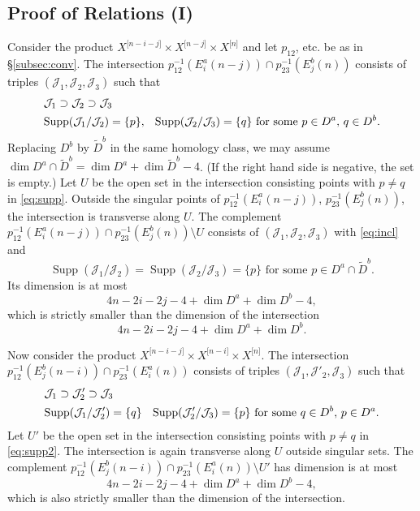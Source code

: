 \documentclass[12pt]{amsart}
\newcommand{\cal}{\mathcal}
\theoremstyle{definition}
\theoremstyle{remark}
\numberwithin{equation}{section}
\newcommand{\subsecref}[1]{\S\ref{#1}}
\newcommand{\Hilb}[2]{{#1}^{\lbrack{#2}\rbrack}} %
\newcommand{\HilbX}[1]{\Hilb{X}{#1}}
\newcommand{\idl}{\cal J} %
\newcommand{\Supp}{\operatorname{Supp}} %
\begin{document}
\subsection{Proof of Relations (I)}
%
Consider the product $\HilbX{n-i-j}\times\HilbX{n-j}\times\HilbX{n}$
and let $p_{12}$, etc. be as in \subsecref{subsec:conv}. The
intersection $p_{12}^{-1}(E_i^a(n-j))\cap p_{23}^{-1}(E_j^b(n))$
consists of triples $(\idl_1, \idl_2, \idl_3)$ such that
\begin{align}
  & \idl_1\supset\idl_2\supset\idl_3 \label{eq:incl}\\
  & \text{$\Supp(\idl_1/\idl_2) = \{ p\}$, \;
    $\Supp(\idl_2/\idl_3) = \{ q\}$ for some $p\in D^a$, $q\in D^b$.}
 \label{eq:supp}
\end{align}
Replacing $D^b$ by $\widetilde D^b$ in the same homology class, we may
assume
$\dim D^a\cap \widetilde D^b = \dim D^a + \dim \widetilde D^b - 4$.
(If the right hand side is negative, the set is empty.)
Let $U$ be the open set in the intersection consisting points
with $p\ne q$ in \eqref{eq:supp}.
Outside the singular points of $p_{12}^{-1}(E_i^a(n-j))$,
$p_{23}^{-1}(E_j^b(n))$, the intersection is transverse along $U$.
The complement
$p_{12}^{-1}(E_i^a(n-j))\cap p_{23}^{-1}(E_j^b(n))\setminus U$
consists of $(\idl_1, \idl_2, \idl_3)$ with \eqref{eq:incl} and
\begin{equation*}
  \text{$\Supp(\idl_1/\idl_2) = \Supp(\idl_2/\idl_3) = \{p\}$ for some
    $p\in D^a\cap \widetilde D^b$.}
\end{equation*}
Its dimension is at most
\begin{equation*}
  4n - 2i - 2j - 4 + \dim D^a + \dim D^b - 4,
\end{equation*}
which is strictly smaller than the dimension of the intersection
\begin{equation*}
  4n - 2i - 2j - 4 + \dim D^a + \dim D^b.
\end{equation*}

Now consider the product
$\HilbX{n-i-j}\times\HilbX{n-i}\times\HilbX{n}$.
The
intersection $p_{12}^{-1}(E_j^b(n-i))\cap p_{23}^{-1}(E_i^a(n))$
consists of triples $(\idl_1, \idl'_2, \idl_3)$ such that
\begin{align}
  & \idl_1\supset\idl'_2\supset\idl_3 \label{eq:incl2}\\
  & \text{$\Supp(\idl_1/\idl'_2) = \{q\}$ \;
    $\Supp(\idl'_2/\idl_3) = \{p\}$ for some $q\in D^b$, $p\in D^a$.}
  \label{eq:supp2}
\end{align}
Let $U'$ be the open set in the intersection consisting points
with $p\ne q$ in \eqref{eq:supp2}.
The intersection is again transverse along $U$ outside singular sets.
The complement
$p_{12}^{-1}(E_j^b(n-i))\cap p_{23}^{-1}(E_i^a(n))\setminus U'$
has dimension is at most
\begin{equation*}
  4n - 2i - 2j - 4 + \dim D^a + \dim D^b - 4,
\end{equation*}
which is also strictly smaller than the dimension of the intersection.
\end{document}
